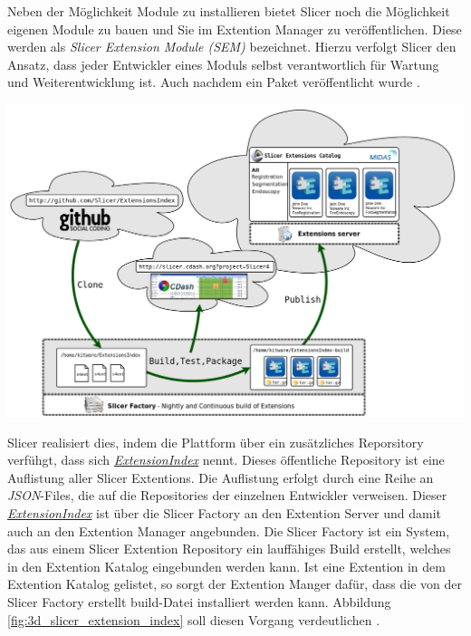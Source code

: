 \begin{minipage}{0.30\textwidth}
	Neben der Möglichkeit Module zu installieren bietet Slicer noch die Möglichkeit
	eigenen Module zu bauen und Sie im Extention Manager zu veröffentlichen. Diese
	werden als \textit{Slicer Extension Module (SEM)} bezeichnet. Hierzu verfolgt
	Slicer den Ansatz, dass jeder Entwickler eines Moduls selbst verantwortlich für
	Wartung und Weiterentwicklung ist. Auch nachdem ein Paket veröffentlicht wurde
	\citep{slicer2024}.
\end{minipage}
\hfill
\begin{minipage}{0.60\textwidth}
	\centering
	\includegraphics[width=1\textwidth]{img/slicer_extention_index.png}
	\label{fig:3d_slicer_extension_index}
\end{minipage}

Slicer realisiert dies, indem die Plattform über ein zusätzliches Reporsitory verfühgt,
dass sich
\href{https://github.com/Slicer/ExtensionsIndex?tab=readme-ov-file}{\textit{ExtensionIndex}}
nennt. Dieses öffentliche Repository ist eine Auflistung aller Slicer Extentions.
Die Auflistung erfolgt durch eine Reihe an \textit{JSON}-Files, die auf die
Repositories der einzelnen Entwickler verweisen. Dieser \href{https://github.com/Slicer/ExtensionsIndex?tab=readme-ov-file}{\textit{ExtensionIndex}}
ist über die Slicer Factory an den Extention Server und damit auch an den Extention
Manager angebunden. Die Slicer Factory ist ein System, das aus einem Slicer Extention
Repository ein lauffähiges Build erstellt, welches in den Extention Katalog
eingebunden werden kann. Ist eine Extention in dem Extention Katalog gelistet,
so sorgt der Extention Manger dafür, dass die von der Slicer Factory erstellt build-Datei
installiert werden kann. Abbildung \ref{fig:3d_slicer_extension_index} soll
diesen Vorgang verdeutlichen \citep[vgl.][]{slicer2024}.

